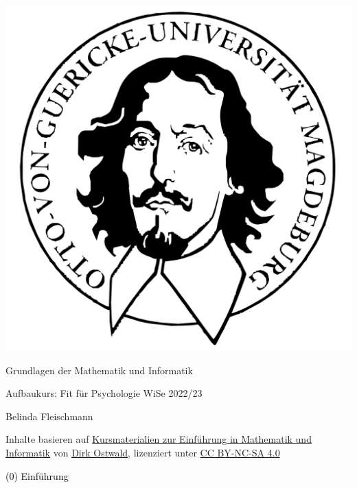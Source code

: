 \documentclass[
  8pt,
  ignorenonframetext,
]{beamer}
\author{}
\date{\vspace{-2.5em}}
\begin{document}
\begin{frame}[plain]{}
\protect\hypertarget{section}{}
\center

\begin{center}\includegraphics[width=0.2\linewidth]{../Abbildungen/glmi_otto} \end{center}

\vspace{2mm}

\huge

Grundlagen der Mathematik und Informatik \vspace{6mm}

\Large

Aufbaukurs: Fit für Psychologie WiSe 2022/23

\vspace{6mm}
\large

Belinda Fleischmann

\vspace{3mm}
\scriptsize

Inhalte basieren auf
\href{https://www.ipsy.ovgu.de/Institut/Abteilungen+des+Institutes/Methodenlehre+I+_+Experimentelle+und+Neurowissenschaftliche+Psychologie/Lehre/Wintersemester+2022/Grundlagen+der+Mathematik+und+Informatik.html}{Kursmaterialien
zur Einführung in Mathematik und Informatik} von
\href{https://www.ipsy.ovgu.de/Institut/Abteilungen+des+Institutes/Methodenlehre+I+_+Experimentelle+und+Neurowissenschaftliche+Psychologie/Team/Dirk+Ostwald.html}{Dirk
Ostwald}, lizenziert unter
\href{https://creativecommons.org/licenses/by-sa/4.0/deed.de}{CC
BY-NC-SA 4.0}
\end{frame}

\begin{frame}[plain]{}
\protect\hypertarget{section-1}{}
\vfill
\center
\huge

\textcolor{black}{(0) Einführung} \vfill
\end{frame}
\end{document}

